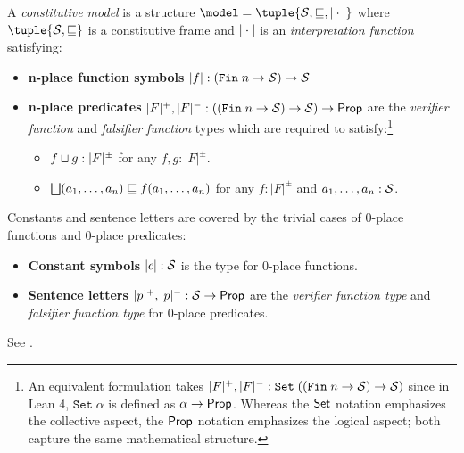 \documentclass[../LogosReference.tex]{subfiles}
\begin{document}
\begin{definition}\label{def:constitutive-model}
	A \emph{constitutive model} is a structure $\model = \tuple{\statespace, \parthood, \interp{\cdot}}$ where $\tuple{\statespace, \parthood}$ is a constitutive frame and $|\cdot|$ is an \textit{interpretation function} satisfying:
	\begin{itemize}
		\item \textbf{n-place function symbols} $|f| : (\mathtt{Fin}\;n \to \mathcal{S}) \to \mathcal{S}$
    \item \textbf{n-place predicates} $|{F}|^+, |{F}|^- : ((\mathtt{Fin}\;n \to \mathcal{S}) \to \mathcal{S}) \to \mathsf{Prop}$ are the \textit{verifier function} and \textit{falsifier function} types which are required to satisfy:\footnote{An equivalent formulation takes $|{F}|^+, |{F}|^- : \mathtt{Set}\;((\mathtt{Fin}\;n \to \mathcal{S}) \to \mathcal{S})$ since in Lean 4, $\mathtt{Set}\;\alpha$ is defined as $\alpha \to \mathsf{Prop}$. Whereas the $\mathsf{Set}$ notation emphasizes the collective aspect, the $\mathsf{Prop}$ notation emphasizes the logical aspect; both capture the same mathematical structure.}
		      \begin{itemize}
            \item $f\sqcup g : |F|^\pm$ for any $f, g : |F|^\pm$.
			      \item $\bigsqcup(a_1, \ldots, a_n) \sqsubseteq f(a_1, \ldots, a_n)$ for any $f : |F|^\pm$ and $a_1, \ldots, a_n : \mathcal{S}$.
		      \end{itemize}
	\end{itemize}
\end{definition}

\begin{remark}\label{rem:trivial-cases}
	Constants and sentence letters are covered by the trivial cases of 0-place functions and 0-place predicates:
	\begin{itemize}
		\item \textbf{Constant symbols} $|c| : \mathcal{S}$ is the type for 0-place functions.
		\item \textbf{Sentence letters} $|{p}|^+, |{p}|^- : \mathcal{S} \to \mathsf{Prop}$ are the \textit{verifier function type} and \textit{falsifier function type} for 0-place predicates.
	\end{itemize}
\end{remark}

\noindent
See .
\end{document}
